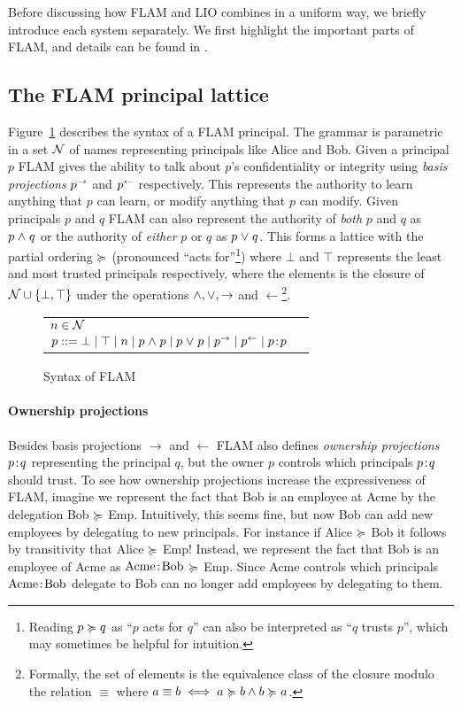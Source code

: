 Before discussing how FLAM and LIO combines in a uniform way, we briefly introduce each system separately. We first highlight the important parts of FLAM, and details can be found in \cite{Arden:2015:FA:2859845.2859998}.

\subsection{The FLAM principal lattice}
Figure~\ref{fig:flam-syntax} describes the syntax of a FLAM principal. The grammar is parametric in a set $\mathcal{N}$ of names representing principals like Alice and Bob. Given a principal $p$ FLAM gives the ability to talk about $p$'s confidentiality or integrity using \emph{basis projections} $p^{\rightarrow}$ and $p^{\leftarrow}$ respectively. This represents the authority to learn anything that $p$ can learn, or modify anything that $p$ can modify. Given principals $p$ and $q$ FLAM can also represent the authority of \emph{both} $p$ and $q$ as $p \mathrel{\land} q$ or the authority of \emph{either} $p$ or $q$ as $p \mathrel{\lor} q$. This forms a lattice with the partial ordering $\succcurlyeq$ (pronounced ``acts for''\footnote{Reading $p \succcurlyeq q$ as ``$p$ acts for $q$'' can also be interpreted as ``$q$ trusts $p$'', which may sometimes be helpful for intuition.}) where $\bot$ and $\top$ represents the least and most trusted principals respectively, where the elements is the closure of $\mathcal{N} \cup \{\bot, \top\}$ under the operations $\mathrel{\land}, \mathrel{\lor}, \rightarrow$ and $\leftarrow$\footnote{Formally, the set of elements is the equivalence class of the closure modulo the relation $\equiv$ where $a \equiv b \iff a \succcurlyeq b \wedge b \succcurlyeq a$.}.

\begin{figure}[h]
    \centering
    \begin{tabular}{ll}
    $n \in \mathcal{N}$ \\
    $p ::= \bot \mid \top \mid n \mid p \mathrel{\land} p \mid p \mathrel{\lor} p \mid p^{\rightarrow} \mid p^{\leftarrow} \mid p\!:\!p$
    \end{tabular}
    \caption{Syntax of FLAM}
    \label{fig:flam-syntax}
\end{figure}

\paragraph{Ownership projections}
Besides basis projections $\rightarrow$ and $\leftarrow$ FLAM also defines \emph{ownership projections} $p\!:\!q$ representing the principal $q$, but the owner $p$ controls which principals $p\!:\!q$ should trust. To see how ownership projections increase the expressiveness of FLAM, imagine we represent the fact that Bob is an employee at Acme by the delegation Bob $\succcurlyeq$ Emp. Intuitively, this seems fine, but now Bob can add new employees by delegating to new principals. For instance if Alice $\succcurlyeq$ Bob it follows by transitivity that Alice $\succcurlyeq$ Emp! Instead, we represent the fact that Bob is an employee of Acme as $\text{Acme}\!:\!\text{Bob}$ $\succcurlyeq$ Emp. Since Acme controls which principals $\text{Acme}\!:\!\text{Bob}$ delegate to Bob can no longer add employees by delegating to them.

